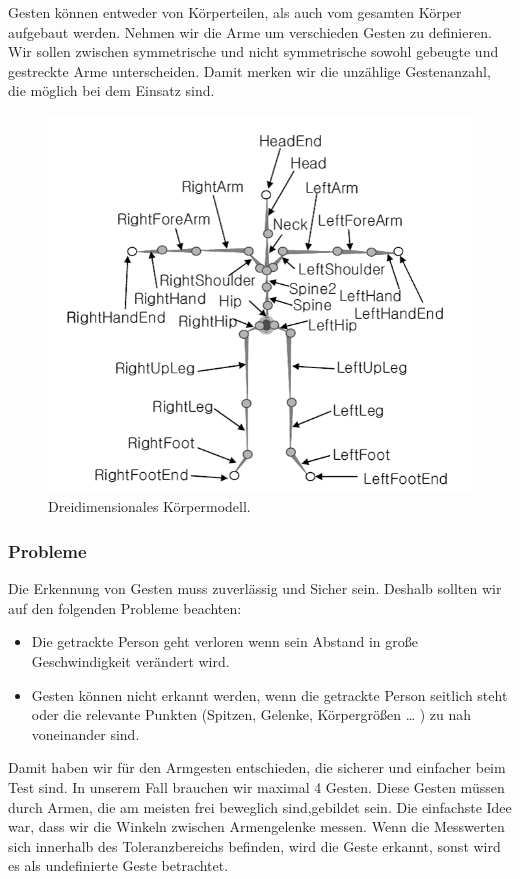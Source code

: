 Gesten können entweder  von Körperteilen, als auch vom gesamten Körper aufgebaut werden.
Nehmen wir die Arme um verschieden Gesten zu definieren. Wir sollen  zwischen symmetrische  und nicht symmetrische sowohl gebeugte und gestreckte Arme unterscheiden.
Damit merken wir die unzählige Gestenanzahl, die möglich bei dem Einsatz sind.
\begin{figure}[h]
	\centering
	\includegraphics[scale=0.7]{graphics/BILD-Skelett.png}
	\caption{Dreidimensionales Körpermodell\cite{Hwang2006}.}
	\label{fig:gesten_skelett}
\end{figure}

\subsubsection{Probleme}
\authorsection{\editorhamza}

Die Erkennung von Gesten muss zuverlässig und Sicher sein. Deshalb sollten wir auf den folgenden Probleme beachten:
\begin{itemize}
\item Die getrackte Person geht verloren wenn sein Abstand in große Geschwindigkeit  verändert wird.
\item Gesten können nicht erkannt werden, wenn die getrackte Person seitlich steht oder die relevante Punkten (Spitzen, Gelenke, Körpergrößen … ) zu nah voneinander sind.
\end{itemize}
Damit haben  wir für den  Armgesten  entschieden, die sicherer und einfacher beim Test sind.
In unserem Fall brauchen wir maximal 4 Gesten.
Diese Gesten müssen durch Armen, die am meisten frei beweglich sind,gebildet sein.
Die einfachste Idee war, dass wir die Winkeln  zwischen Armengelenke messen. Wenn die Messwerten sich  innerhalb des Toleranzbereichs befinden, wird die Geste erkannt, sonst  wird es als undefinierte Geste betrachtet.

